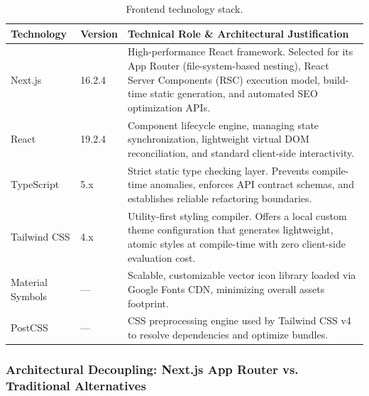 \documentclass[12pt,a4paper]{article}
\begin{document}
\begin{table}[H]
\centering
\begin{tabular}{@{}llp{7.5cm}@{}}
\toprule
\textbf{Technology} & \textbf{Version} & \textbf{Technical Role \& Architectural Justification} \\
\midrule
Next.js & 16.2.4 & High-performance React framework. Selected for its App Router (file-system-based nesting), React Server Components (RSC) execution model, build-time static generation, and automated SEO optimization APIs. \\
React & 19.2.4 & Component lifecycle engine, managing state synchronization, lightweight virtual DOM reconciliation, and standard client-side interactivity. \\
TypeScript & 5.x & Strict static type checking layer. Prevents compile-time anomalies, enforces API contract schemas, and establishes reliable refactoring boundaries. \\
Tailwind CSS & 4.x & Utility-first styling compiler. Offers a local custom theme configuration that generates lightweight, atomic styles at compile-time with zero client-side evaluation cost. \\
Material Symbols & — & Scalable, customizable vector icon library loaded via Google Fonts CDN, minimizing overall assets footprint. \\
PostCSS & — & CSS preprocessing engine used by Tailwind CSS v4 to resolve dependencies and optimize bundles. \\
\bottomrule
\end{tabular}
\caption{Frontend technology stack.}
\end{table}

\subsubsection{Architectural Decoupling: Next.js App Router vs. Traditional Alternatives}
\end{document}

